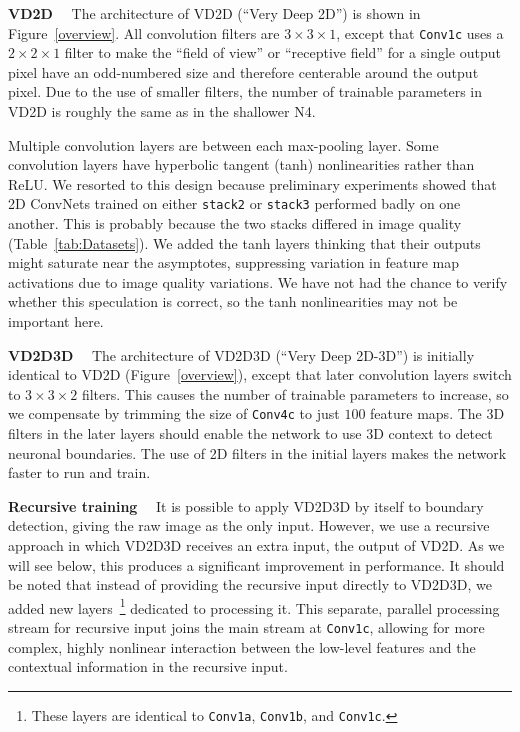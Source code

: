 \documentclass{article} %
\begin{document}
{\bf VD2D}$\quad$
The architecture of VD2D (``Very Deep 2D'') is shown in
Figure~\ref{overview}.  All convolution filters are $3\times3\times1$, except that
\texttt{Conv1c} uses a $2\times2\times1$ filter to make the ``field of view'' or ``receptive field'' for a single output pixel have an odd-numbered size and therefore centerable around the output pixel.  Due to the use of smaller filters, the number of trainable parameters in VD2D is roughly the same as in the shallower N4.

Multiple convolution layers are between each max-pooling layer. Some
convolution layers have hyperbolic tangent (tanh) nonlinearities rather than ReLU. We
resorted to this design because preliminary experiments showed that 2D
ConvNets trained on either \texttt{stack2} or \texttt{stack3}
performed badly on one another.  This is probably because the two
stacks differed in image quality (Table~\ref{tab:Datasets}).  We added the
tanh layers thinking that their outputs might saturate near the asymptotes,
suppressing variation in feature map activations due to image quality
variations. We have not had the chance to verify whether this
speculation is correct, so the tanh nonlinearities may not be
important here.

{\bf VD2D3D}$\quad$
The architecture of VD2D3D (``Very Deep 2D-3D'') is initially identical to VD2D (Figure~\ref{overview}), except that later convolution layers switch to $3\times 3\times 2$ filters. This causes the number of trainable parameters to increase, so we compensate by trimming the size of \texttt{Conv4c} to just $100$ feature maps.  The 3D filters in the later layers should enable the network to use 3D context to detect neuronal boundaries.  The use of 2D filters in the initial layers makes the network faster to run and train.

{\bf Recursive training}$\quad$
It is possible to apply VD2D3D by itself to boundary detection, giving
the raw image as the only input. However, we use a recursive approach
in which VD2D3D receives an extra input, the output of VD2D. As we will see below, this produces a significant improvement in performance. It should be noted that instead of providing the recursive input directly to VD2D3D, we added new layers~\footnote{These layers are identical to \texttt{Conv1a}, \texttt{Conv1b}, and \texttt{Conv1c}.} dedicated to processing it. This separate, parallel processing stream for recursive input joins the main stream at \texttt{Conv1c}, allowing for more complex, highly nonlinear interaction between the low-level features and the contextual information in the recursive input.
\end{document}
